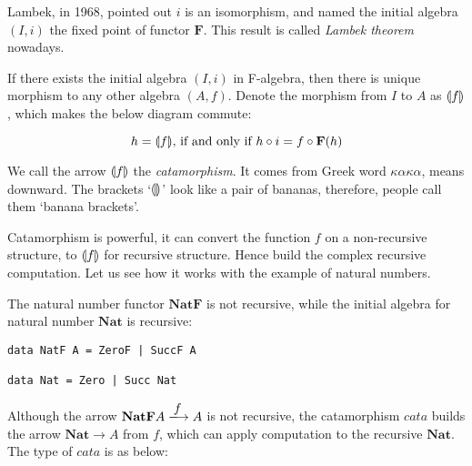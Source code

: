 \documentclass{article}
\begin{document}
Lambek, in 1968, pointed out $i$ is an isomorphism, and named the initial algebra $(I, i)$ the fixed point of functor $\mathbf{F}$. This result is called {\em Lambek theorem} nowadays\cite{Lambek-1968}.

If there exists the initial algebra $(I, i)$ in F-algebra, then there is unique morphism to any other algebra $(A, f)$. Denote the morphism from $I$ to $A$ as $\llparenthesis f \rrparenthesis$, which makes the below diagram commute:

\begin{center}
\end{center}

\[
  h = \lbb f \rbb \text{, if and only if}\ h \circ i = f \circ \mathbf{F}(h)
\]

We call the arrow $\llparenthesis f \rrparenthesis$ the {\em catamorphism}. It comes from Greek word $\kappa \alpha \kappa \alpha$, means downward. The brackets `$\llparenthesis \rrparenthesis$' look like a pair of bananas, therefore, people call them `banana brackets'.

Catamorphism is powerful, it can convert the function $f$ on a non-recursive structure, to $\llparenthesis f \rrparenthesis$ for recursive structure. Hence build the complex recursive computation. Let us see how it works with the example of natural numbers.

The natural number functor $\mathbf{NatF}$ is not recursive, while the initial algebra for natural number $\mathbf{Nat}$ is recursive:

\begin{lstlisting}
data NatF A = ZeroF | SuccF A

data Nat = Zero | Succ Nat
\end{lstlisting}

Although the arrow $\mathbf{NatF} A \arrowto{f} A$ is not recursive, the catamorphism $cata$ builds the arrow $\mathbf{Nat} \to A$ from $f$, which can apply computation to the recursive $\mathbf{Nat}$. The type of $cata$ is as below:
\end{document}
